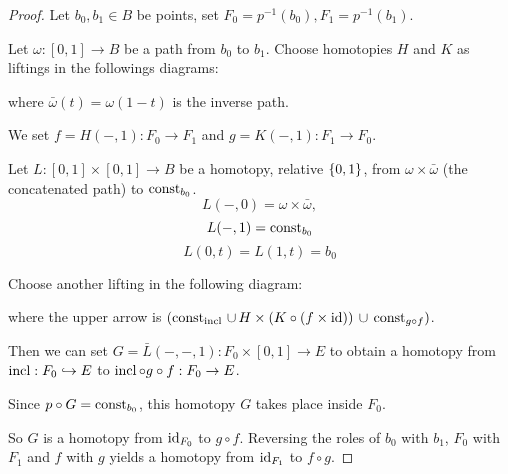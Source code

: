 \begin{proof}
Let $b_0,b_1\in B$ be points, set $F_0=p^{-1}(b_0),F_1=p^{-1}(b_1)$.

Let $\omega:[0,1]\to B$ be a path from $b_0$ to $b_1$. Choose homotopies $H$ and $K$ as liftings in the followings diagrams:
\begin{center}
\qquad
{}
\end{center}

where $\bar\omega(t)=\omega(1-t)$ is the inverse path.

We set $f=H(-,1):F_0\to F_1$ and $g=K(-,1):F_1\to F_0$.

Let $L:[0,1]\times[0,1]\to B$ be a homotopy, relative $\{0,1\}$, from $\omega\times\bar\omega$ (the concatenated path) to $\operatorname{const}_{b_0}$.
\[L(-,0)=\omega\times\bar\omega,\]
\[L(-,1)=\operatorname{const}_{b_0}\]
\[L(0,t)=L(1,t)=b_0\]

Choose another lifting in the following diagram:

\begin{center}
\end{center}
where the upper arrow is $(\operatorname{const}_{\operatorname{incl}}\,\cup\, H\times(K\circ(f\times\operatorname{id}))\,\cup\,\operatorname{const}_{g\circ f})$.

Then we can set $G=\bar L(-,-,1):F_0\times[0,1]\to E$ to obtain a homotopy from $\operatorname{incl}:F_0\hookrightarrow E$ to $\operatorname{incl}\circ g\circ f:F_0\to E$.

Since $p\circ G=\operatorname{const}_{b_0}$, this homotopy $G$ takes place inside $F_0$.

So $G$ is a homotopy from $\operatorname{id}_{F_0}$ to $g\circ f$. Reversing the roles of $b_0$ with $b_1$, $F_0$ with $F_1$ and $f$ with $g$ yields a homotopy from $\operatorname{id}_{F_1}$ to $f\circ g$.
\end{proof}

